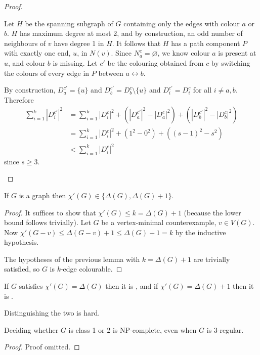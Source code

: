 \documentclass[main.tex]{subfiles}
\begin{document}
\begin{proof}
\begin{itemize}
      Let $H$ be the spanning subgraph of $G$ containing only the edges with
      colour $a$ or $b$.
      $H$ has maximum degree at most 2, and by construction, an odd number of
      neighbours of $v$ have degree 1 in $H$.
      It follows that $H$ has a path component $P$ with exactly one end, $u$,
      in $N(v)$.
      Since $N_a^c = \varnothing$, we know colour $a$ is present at $u$,
      and colour $b$ is missing.
      Let $c'$ be the colouring obtained from $c$ by switching the colours of
      every edge in $P$ between $a\leftrightarrow b$.

      By construction, $D_a^{c'}= \{u\}$ and $D_b^{c'} = D_b^c\setminus\{u\}$
      and $D_i^{c'} = D_i^c$ for all $i\neq a,b$.
      Therefore
      \begin{align*}
        \sum_{i=1}^k|D_i^{c'}|^2
        &= \sum_{i=1}^k |D_i^c|^2 + (|D_a^{c'}|^2 - |D_a^c|^2) + (|D_b^{c'}|^2 - |D_b^c|^2) \\
        &= \sum_{i=1}^k |D_i^c|^2 + (1^2 - 0^2) + ((s-1)^2 - s^2) \\
        &< \sum_{i=1}^k |D_i^c|^2
      \end{align*}
      since $s\geq 3$. \qedhere
  \end{itemize}
\end{proof}
\begin{theorem}
  If $G$ is a graph then $\chi'(G)\in\{\Delta(G),\Delta(G)+1\}$.
\end{theorem}
\begin{proof}
  It suffices to show that $\chi'(G)\leq k = \Delta(G) + 1$
  (because the lower bound follows trivially).
  Let $G$ be a vertex-minimal counterexample, $v\in V(G)$.
  Now $\chi'(G-v)\leq\Delta(G-v)+1\leq\Delta(G) + 1 = k$ by the inductive hypothesis.

  The hypotheses of the previous lemma with $k = \Delta(G) + 1$ are trivially
  satisfied, so $G$ is $k$-edge colourable.
\end{proof}
\begin{remark*}
  If $G$ satisfies $\chi'(G) = \Delta(G)$ then it is ,
  and if $\chi'(G) = \Delta(G) + 1$ then it is .
\end{remark*}
Distinguishing the two is hard.
\begin{theorem}[Holger 1981]
  Deciding whether $G$ is class 1 or 2 is NP-complete, even when $G$ is 3-regular.
\end{theorem}
\begin{proof}
  Proof omitted.
\end{proof}
\end{document}
